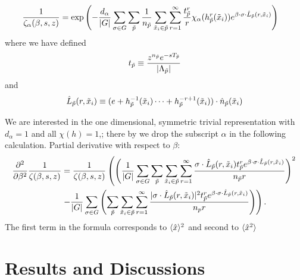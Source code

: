 \documentclass[aps,pre,preprint,groupedaddress, floatfix]{revtex4-1}
\begin{document}
\begin{align}
\frac{1}{\zeta_{\alpha}(\beta,s,z)} &=\exp\left(
-\frac{d_\alpha}{|G|}\sum_{\sigma\in G}\sum_{{\tilde p}}\frac{1}{n_{{\tilde p}}}
\sum_{\tilde x_{i}\in\tilde{p}}\sum_{r=1}^{\infty}
\frac{t_{{\tilde p}}^{r}}{r}\chi_{\alpha}(h_{\tilde p}^{r}(\tilde x_i))
e^{\beta\cdot\sigma\cdot\hat{L}_{{\tilde p}}(r,\tilde x_i)}
\right)
\end{align}
where we have defined
\begin{equation}
t_{{\tilde p}}\equiv \frac{z^{n_{{\tilde p}}}e^{-sT_{{\tilde p}}}}{|\Lambda_{\tilde p}|}
\end{equation}
and
\begin{equation}
\hat{L}_{{\tilde p}}(r,\tilde x_i)\equiv (e+h_{\tilde p}^{-1}(\tilde x_i)\cdots+h_{\tilde p}^{-r+1}(\tilde x_i))\cdot\hat n_{{\tilde p}}(\tilde x_i)
\end{equation}

We are interested in the one dimensional, symmetric trivial
representation with $ d_\alpha = 1 $ and all $ \chi(h) = 1 $,; there by
we drop the subscript $ \alpha $ in the following calculation. Partial
derivative with respect to $\beta$:
\begin{align}
\frac{\partial^{2}}{\partial\beta^{2}}\frac{1}{\zeta(\beta,s,z)}
 &=\frac{1}{\zeta(\beta,s,z)}\left(\left(\frac{1}{|G|}
\sum_{\sigma\in G}\sum_{{\tilde p}}\sum_{\tilde x_i\in {\tilde p}}\sum_{r=1}^{\infty}\frac{\sigma\cdot \hat{L}_{{\tilde p}}(r,\tilde x_i)t_{{\tilde p}}^r e^{\beta\cdot\sigma\cdot \hat{L}_{{\tilde p}}(r,\tilde x_i)}}{n_{{\tilde p}}r}\right)^{2}\right.\nonumber\\
 & \left.-\frac{1}{|G|}\sum_{\sigma\in G}\left(\sum_{{\tilde p}}\sum_{\tilde x_i\in {\tilde p}}\sum_{r=1}^{\infty}\frac{\vert \sigma\cdot \hat{L}_{{\tilde p}}(r,\tilde x_i)\vert^{2}t_{{\tilde p}}^{r}e^{\beta\cdot\sigma\cdot \hat{L}_{{\tilde p}}(r,\tilde x_i)}}{n_{p}r}\right)\right).
\end{align}
The first term in the formula corresponds to $ \langle\hat x\rangle^2 $ and
second to $ \langle\hat x^2\rangle $


\section{Results and Discussions}
\end{document}
